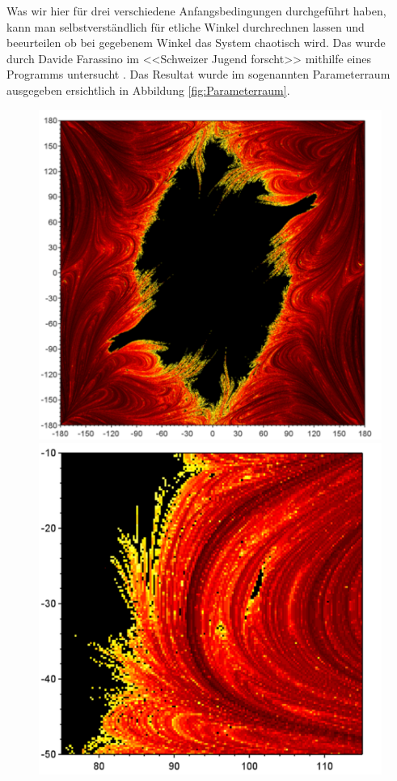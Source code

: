Was wir hier für drei verschiedene Anfangsbedingungen durchgeführt haben, kann man selbstverständlich
für etliche Winkel durchrechnen lassen und beeurteilen ob bei gegebenem Winkel das System chaotisch wird.
Das wurde durch Davide Farassino im <<Schweizer Jugend forscht>> 
mithilfe eines Programms untersucht \cite{doppelpendel:wettbewerbsarbeit}.
Das Resultat wurde im sogenannten Parameterraum ausgegeben
ersichtlich in Abbildung \ref{fig:Parameterraum}.
\begin{figure}
    \centering
    \begin{minipage}{0.45\textwidth}
        \centering
        \includegraphics[width=\textwidth]{papers/doppelpendel/images/parameterraum.png}
    \end{minipage}
    \hfill
    \begin{minipage}{0.45\textwidth}
        \centering
        \includegraphics[width=\textwidth]{papers/doppelpendel/images/parameterraum_stabile_inseln.png}

\end{minipage}
\end{figure}
